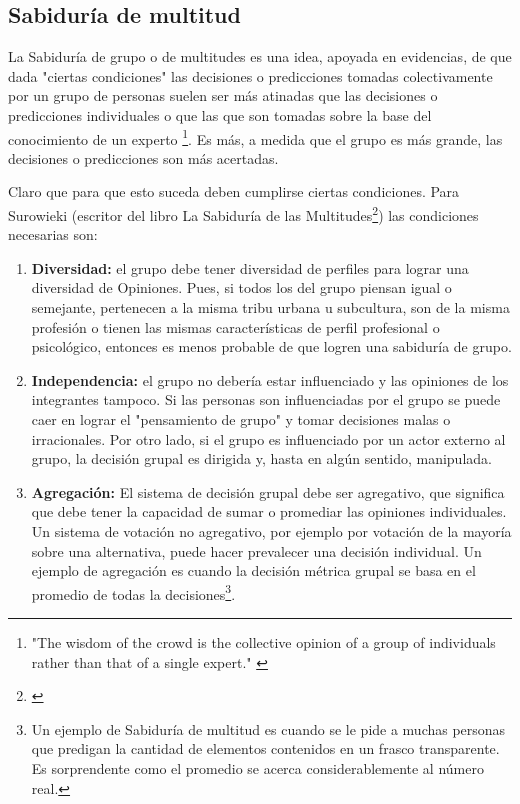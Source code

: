 \subsection{Sabiduría de multitud}

La Sabiduría de grupo o de multitudes es una idea, apoyada en evidencias, de que dada "ciertas condiciones" las decisiones o predicciones tomadas colectivamente por un grupo de personas suelen ser más atinadas que las decisiones o predicciones individuales o que las que son tomadas sobre la base del conocimiento de un experto \cite{James-Surowiecki-2005}\footnote{"The wisdom of the crowd is the collective opinion of a group of individuals rather than that of a single expert." \cite{MIT-Press-2009}}. Es más, a medida que el grupo es más grande, las decisiones o predicciones son más acertadas.

Claro que para que esto suceda deben cumplirse ciertas condiciones. Para Surowieki (escritor del libro La Sabiduría de las Multitudes\footnote{\cite{James-Surowiecki-2005}}) las condiciones necesarias son:

\begin{enumerate}

\item \textbf{Diversidad:} el grupo debe tener diversidad de perfiles para lograr una diversidad de Opiniones. Pues, si todos los del grupo piensan igual o semejante, pertenecen a la misma tribu urbana u subcultura, son de la misma profesión o tienen las mismas características de perfil profesional o psicológico, entonces es menos probable de que logren una sabiduría de grupo.

\item \textbf{Independencia:} el grupo no debería estar influenciado y las opiniones de los integrantes tampoco. Si las personas son influenciadas por el grupo se puede caer en lograr el "pensamiento de grupo" y tomar decisiones malas o irracionales. Por otro lado, si el grupo es influenciado por un actor externo al grupo, la decisión grupal es dirigida y, hasta en algún sentido, manipulada.

\item \textbf{Agregación:} El sistema de decisión grupal debe ser agregativo, que significa que debe tener la capacidad de sumar o promediar las opiniones individuales. Un sistema de votación no agregativo, por ejemplo por votación de la mayoría sobre una alternativa, puede hacer prevalecer una decisión individual. Un ejemplo de agregación es cuando la decisión métrica grupal se basa en el promedio de todas la decisiones\footnote{Un ejemplo de Sabiduría de multitud es cuando se le pide a muchas personas que predigan la cantidad de elementos contenidos en un frasco transparente. Es sorprendente como el promedio se acerca considerablemente al número real.}.


\end{enumerate}

